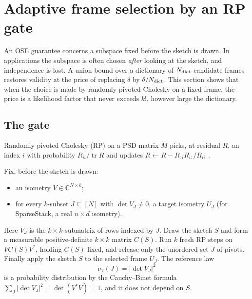 \documentclass[11pt,a4paper]{article}
\theoremstyle{definition}
\theoremstyle{remark}
\newcommand{\C}{\mathbb C}
\newcommand{\tr}{\operatorname{tr}}
\newcommand{\1}{\mathbf 1}
\begin{document}
\section{Adaptive frame selection by an RP gate}\label{sec:gate}

An OSE guarantee concerns a subspace fixed before the sketch is drawn.
In applications the subspace is often chosen \emph{after} looking at
the sketch, and independence is lost. A union bound over a dictionary of
$N_{\rm dict}$ candidate frames restores validity at the price of
replacing $\delta$ by $\delta/N_{\rm dict}$. This section shows that when
the choice is made by randomly pivoted Cholesky on a fixed frame, the
price is a likelihood factor that never exceeds $k!$, however large the
dictionary.

\subsection{The gate}
Randomly pivoted Cholesky (RP) on a PSD matrix $M$ picks, at residual
$R$, an index $i$ with probability $R_{ii}/\tr R$ and updates
$R\leftarrow R-R_{:i}R_{i:}/R_{ii}$~\cite{CETW}.

Fix, before the sketch is drawn:
\begin{itemize}[leftmargin=2em]
\item an isometry $V\in\C^{N\times k}$;
\item for every $k$-subset $J\subseteq[N]$ with $\det V_J\ne0$, a target
isometry $U_J$ (for SparseStack, a real $n\times d$ isometry).
\end{itemize}
Here $V_J$ is the $k\times k$ submatrix of rows indexed by $J$. Draw the
sketch $S$ and form a measurable positive-definite $k\times k$ matrix
$C(S)$. Run $k$ fresh RP steps on $VC(S)V^*$, holding $C(S)$ fixed, and
release only the unordered set $J$ of pivots. Finally apply the sketch
$S$ to the selected frame $U_J$. The reference law
\[
 \nu_V(J)=|\det V_J|^2
\]
is a probability distribution by the Cauchy--Binet formula
$\sum_J|\det V_J|^2=\det(V^*V)=1$, and it does not depend on $S$.
\end{document}
